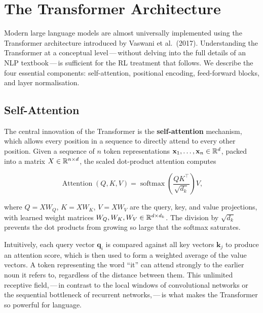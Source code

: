 \section{The Transformer Architecture}
\label{sec:transformer}

Modern large language models are almost universally implemented using the Transformer architecture introduced by Vaswani et al.\ (2017). Understanding the Transformer at a conceptual level\,---\,without delving into the full details of an NLP textbook\,---\,is sufficient for the RL treatment that follows. We describe the four essential components: self-attention, positional encoding, feed-forward blocks, and layer normalisation.

\subsection{Self-Attention}

The central innovation of the Transformer is the \textbf{self-attention} mechanism, which allows every position in a sequence to directly attend to every other position. Given a sequence of $n$ token representations $\mathbf{x}_1, \ldots, \mathbf{x}_n \in \mathbb{R}^d$, packed into a matrix $X \in \mathbb{R}^{n \times d}$, the scaled dot-product attention computes

\begin{equation}
\label{eq:self-attention}
\operatorname{Attention}(Q, K, V) = \operatorname{softmax}\!\left(\frac{QK^\top}{\sqrt{d_k}}\right) V,
\end{equation}

where $Q = XW_Q$, $K = XW_K$, $V = XW_V$ are the query, key, and value projections, with learned weight matrices $W_Q, W_K, W_V \in \mathbb{R}^{d \times d_k}$. The division by $\sqrt{d_k}$ prevents the dot products from growing so large that the softmax saturates.

Intuitively, each query vector $\mathbf{q}_i$ is compared against all key vectors $\mathbf{k}_j$ to produce an attention score, which is then used to form a weighted average of the value vectors. A token representing the word ``it'' can attend strongly to the earlier noun it refers to, regardless of the distance between them. This unlimited receptive field,\,---\,in contrast to the local windows of convolutional networks or the sequential bottleneck of recurrent networks,\,---\,is what makes the Transformer so powerful for language.

